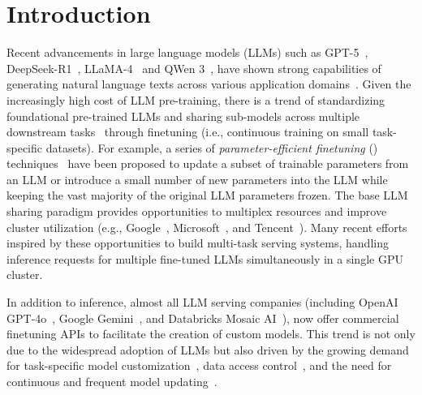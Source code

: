 \section{Introduction}
\label{sec:intro}
%
Recent advancements in large language models (LLMs) such as GPT-5~\cite{gpt5,openai2023gpt4}, DeepSeek-R1~\cite{guo2025deepseek}, LLaMA-4~\cite{touvron2023llama, llama3,llama4} and QWen 3~\cite{qwen2025qwen25technicalreport,yang2025qwen3technicalreport}, have shown strong capabilities of generating natural language texts across various application domains~\cite{zhang2019pretraining, liu2021makes, stiennon2020learning,dosovitskiy2020image}.
%
Given the increasingly high cost of LLM pre-training, there is a trend of standardizing foundational pre-trained LLMs and sharing sub-models across multiple downstream tasks~\cite{houlsby2019parameter,zhang2021share} through finetuning (i.e., continuous training on small task-specific datasets). For example, a series of {\em parameter-efficient finetuning} (\peft) techniques~\cite{houlsby2019parameter,li2021prefix,pfeiffer2020adapterfusion,hu2021lora,he2021towards,lester2021power} have been proposed to update a subset of trainable parameters from an LLM or introduce a small number of new parameters into the LLM while keeping the vast majority of the original LLM parameters frozen. The base LLM sharing paradigm provides opportunities to multiplex resources and improve cluster utilization (e.g., Google~\cite{barham2022pathways}, Microsoft~\cite{hu2021lora}, and Tencent~\cite{nie2023angel}).
Many recent efforts~\cite{zhou2022pets,wu2024dlora,sheng2023s,chen2023punica,zhao2024lora,iliakopoulou2024chameleon} inspired by these opportunities to build multi-task serving systems, handling inference requests for multiple fine-tuned LLMs simultaneously in a single GPU cluster.

In addition to inference, almost all LLM serving companies (including OpenAI GPT-4o~\cite{openaifinetuning}, Google Gemini~\cite{googlefinetuning}, and Databricks Mosaic AI~\cite{databricksfinetuning}), now offer commercial finetuning APIs to facilitate the creation of custom models.
This trend is not only due to the widespread adoption of LLMs but also driven by the growing demand for task-specific model customization~\cite{liu2024customizing}, data access control~\cite{tan2024democratizing}, and the need for continuous and frequent model updating~\cite{gao2023unified}.

